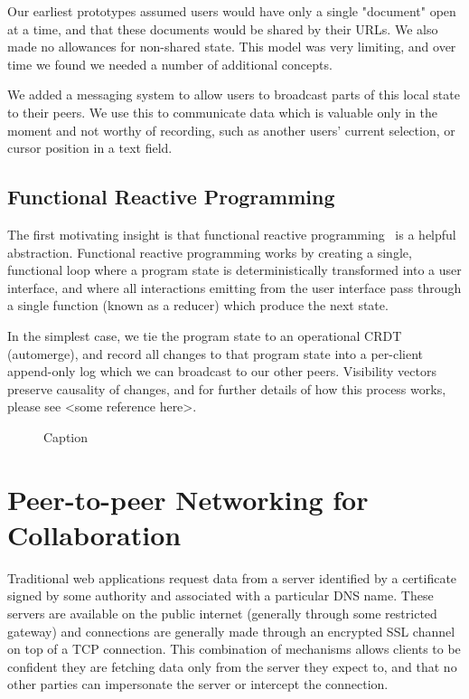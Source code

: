 \documentclass[sigplan,10pt]{acmart}
\begin{document}


Our earliest prototypes assumed users would have only a single "document" open at a time, and that these documents would be shared by their URLs. We also made no allowances for non-shared state. This model was very limiting, and over time we found we needed a number of additional concepts.

We added a messaging system to allow users to broadcast parts of this local state to their peers. We use this to communicate data which is valuable only in the moment and not worthy of recording, such as another users' current selection, or cursor position in a text field.

\subsection{Functional Reactive Programming}
The first motivating insight is that functional reactive programming~\cite{Czaplicki:2013ig} is a helpful abstraction. Functional reactive programming works by creating a single, functional loop where a program state is deterministically transformed into a user interface, and where all interactions emitting from the user interface pass through a single function (known as a reducer) which produce the next state.

In the simplest case, we tie the program state to an operational CRDT (automerge), and record all changes to that program state into a per-client append-only log which we can broadcast to our other peers. Visibility vectors preserve causality of changes, and for further details of how this process works, please see <some reference here>.

\begin{figure}
    \centering
    \caption{Caption}
    \label{fig:my_label}
\end{figure}

\section{Peer-to-peer Networking for Collaboration}

Traditional web applications request data from a server identified by a certificate signed by some authority and associated with a particular DNS name. These servers are available on the public internet (generally through some restricted gateway) and connections are generally made through an encrypted SSL channel on top of a TCP connection. This combination of mechanisms allows clients to be confident they are fetching data only from the server they expect to, and that no other parties can impersonate the server or intercept the connection. 
\end{document}
